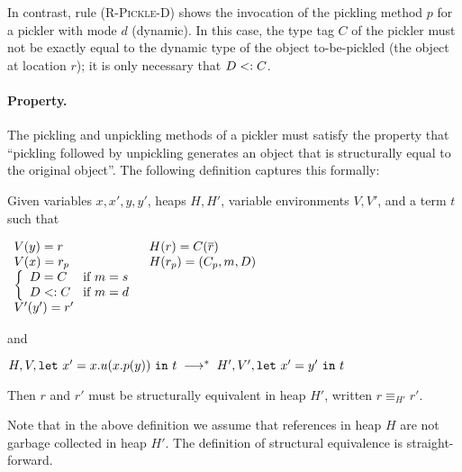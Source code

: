 In contrast, rule \textsc{(R-Pickle-D)} shows the invocation of the pickling
method $p$ for a pickler with mode $d$ (dynamic). In this case, the type tag
$C$ of the pickler must not be exactly equal to the dynamic type of the object
to-be-pickled (the object at location $r$); it is only necessary that $D <:
C$.

\paragraph{Property.} The pickling and unpickling methods of a pickler must
satisfy the property that ``pickling followed by unpickling generates an
object that is structurally equal to the original object''. The following
definition captures this formally:

\begin{defn}

Given variables $x,x',y,y'$, heaps $H,H'$, variable environments $V,V'$, and a
term $t$ such that

$\ba[t]{ll@{\hspace{2mm}}}
V(y) = r     &  H(r)   = C(\seq{r})  \\
V(x) = r_p   &  H(r_p) = (C_p, m, D) \\
\left\{
  \ba{ll}
  D = C     & \text{if}~m=s \\
  D \sub C  & \text{if}~m=d
  \ea
  \right.   &               \\
V'(y') = r'  &               \\
\ea$

and

$
H, V, \texttt{let}~x' = x.u(x.p(y))~\texttt{in}~t \\ \;\longrightarrow^{\ast}\; H', V', \texttt{let}~x' = y'~\texttt{in}~t
$

Then $r$ and $r'$ must be structurally equivalent in heap $H'$, written $r
\equiv_{H'} r'$.

\end{defn}

Note that in the above definition we assume that references in heap $H$ are
not garbage collected in heap $H'$. The definition of structural equivalence
is straight-forward.


